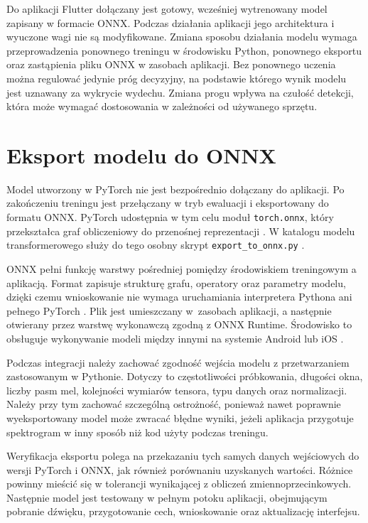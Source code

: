 Do aplikacji Flutter dołączany jest gotowy, wcześniej wytrenowany model zapisany w formacie ONNX. Podczas działania aplikacji jego architektura i wyuczone wagi nie są modyfikowane. Zmiana sposobu działania modelu wymaga przeprowadzenia ponownego treningu w środowisku Python, ponownego eksportu oraz zastąpienia pliku ONNX w zasobach aplikacji. Bez ponownego uczenia można regulować jedynie próg decyzyjny, na podstawie którego wynik modelu jest uznawany za wykrycie wydechu. Zmiana progu wpływa na czułość detekcji, która może wymagać dostosowania w zależności od używanego sprzętu.

\section{Eksport modelu do ONNX}

Model utworzony w PyTorch nie jest bezpośrednio dołączany do aplikacji. Po zakończeniu treningu jest przełączany w tryb ewaluacji i eksportowany do formatu ONNX. PyTorch udostępnia w tym celu moduł \texttt{torch.onnx}, który przekształca graf obliczeniowy do przenośnej reprezentacji \cite{pytorchOnnxExporter2026}. W katalogu modelu transformerowego służy do tego osobny skrypt \texttt{export\_to\_onnx.py} \cite{breathingClassificationGithub2026}.

ONNX pełni funkcję warstwy pośredniej pomiędzy środowiskiem treningowym a aplikacją. Format zapisuje strukturę grafu, operatory oraz parametry modelu, dzięki czemu wnioskowanie nie wymaga uruchamiania interpretera Pythona ani pełnego PyTorch \cite{onnxConcepts2026}. Plik jest umieszczany w~zasobach aplikacji, a następnie otwierany przez warstwę wykonawczą zgodną z ONNX Runtime. Środowisko to obsługuje wykonywanie modeli między innymi na systemie Android lub iOS \cite{onnxRuntimeMobile2026}.

Podczas integracji należy zachować zgodność wejścia modelu z przetwarzaniem zastosowanym w Pythonie. Dotyczy to częstotliwości próbkowania, długości okna, liczby pasm mel, kolejności wymiarów tensora, typu danych oraz normalizacji. Należy przy tym zachować szczególną ostrożność, ponieważ nawet poprawnie wyeksportowany model może zwracać błędne wyniki, jeżeli aplikacja przygotuje spektrogram w inny sposób niż kod użyty podczas treningu.

Weryfikacja eksportu polega na przekazaniu tych samych danych wejściowych do wersji PyTorch i ONNX, jak również porównaniu uzyskanych wartości. Różnice powinny mieścić się w tolerancji wynikającej z obliczeń zmiennoprzecinkowych. Następnie model jest testowany w pełnym potoku aplikacji, obejmującym pobranie dźwięku, przygotowanie cech, wnioskowanie oraz aktualizację interfejsu.

